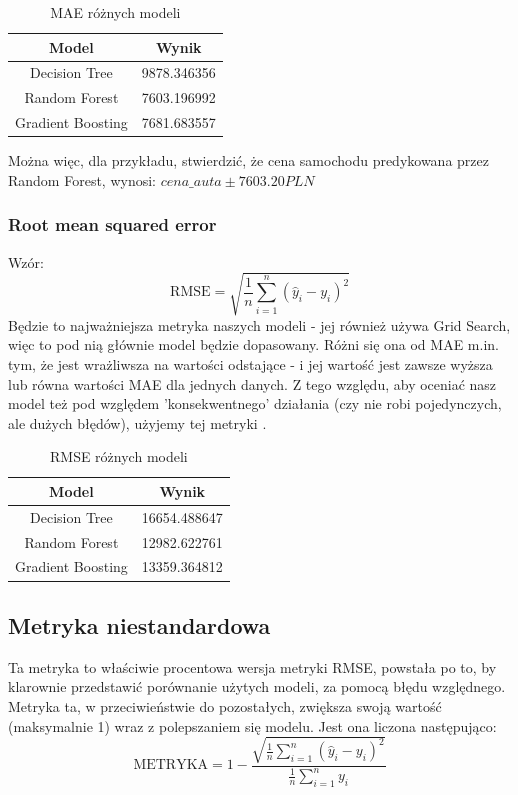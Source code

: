 \documentclass{article}
\begin{document}
\begin{table}[H]
    \centering
    \begin{tabular}{cc}
        \textbf{Model} & \textbf{Wynik} \\ \hline
        Decision Tree & 9878.346356 \\
        Random Forest & 7603.196992 \\
        Gradient Boosting & 7681.683557
    \end{tabular}
    \caption{MAE różnych modeli}
\end{table}

Można więc, dla przykładu, stwierdzić, że cena samochodu predykowana przez Random Forest, wynosi: $cena\_auta \pm 7603.20 PLN$

\subsubsection{Root mean squared error}
Wzór:
\[
\text{RMSE} = \sqrt{\frac{1}{n} \sum_{i=1}^{n} (\hat{y}_i - y_i)^2}
\]
Będzie to najważniejsza metryka naszych modeli - jej również używa Grid Search, więc to pod nią głównie model będzie dopasowany. Różni się ona od MAE m.in. tym, że jest wrażliwsza na wartości odstające - i jej wartość jest zawsze wyższa lub równa wartości MAE dla jednych danych. Z tego względu, aby oceniać nasz model też pod względem 'konsekwentnego' działania (czy nie robi pojedynczych, ale dużych błędów), użyjemy tej metryki \cite{root_mean_squared_error}.

\begin{table}[H]
    \centering
    \begin{tabular}{cc}
        \textbf{Model} & \textbf{Wynik} \\ \hline
        Decision Tree & 16654.488647 \\
        Random Forest & 12982.622761 \\
        Gradient Boosting & 13359.364812
    \end{tabular}
    \caption{RMSE różnych modeli}
\end{table}

\subsection{Metryka niestandardowa}
Ta metryka to właściwie procentowa wersja metryki RMSE, powstała po to, by klarownie przedstawić porównanie użytych modeli, za pomocą błędu względnego. Metryka ta, w przeciwieństwie do pozostałych, zwiększa swoją wartość (maksymalnie 1) wraz z polepszaniem się modelu. Jest ona liczona następująco:
\begin{equation}
    \text{METRYKA} = 1 - \frac{\sqrt{\frac{1}{n} \sum_{i=1}^{n} (\hat{y}_i - y_i)^2}}{\frac{1}{n} \sum_{i=1}^{n}y_i}
\end{equation}
\end{document}
